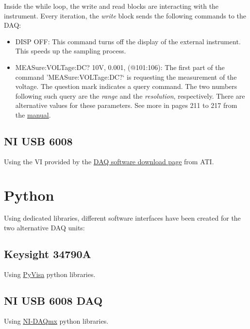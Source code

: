 \documentclass[a4paper]{article}
\begin{document}
Inside the while loop, the write and read blocks are interacting with the instrument. Every iteration, the \textit{write} block sends the following commands to the DAQ:

\begin{itemize}
	\item DISP OFF: This command turns off the display of the external instrument. This speeds up the sampling process.
	\item MEASure:VOLTage:DC? 10V, 0.001, (@101:106): The first part of the command 'MEASure:VOLTage:DC$?$` is requesting the measurement of the voltage. The question mark indicates a query command. The two numbers following such query are the \textit{range} and the \textit{resolution}, respectively. There are alternative values for these parameters. See more in pages 211 to 217 from the \hyperref{https://www.manualsbase.com/manual/439362/switch/hp_(hewlett-packard)/hp_34970a/}{category}{name}{manual}.
\end{itemize}

\subsection{NI USB 6008}

Using the VI provided by the \hyperref{https://www.ati-ia.com/products/ft/software/daq_software.aspx}{category}{name}{DAQ software download page} from ATI.


\section{Python}

Using dedicated libraries, different software interfaces have been created for the two alternative DAQ units:

\subsection{Keysight 34790A}

Using \hyperref{https://pyvisa.readthedocs.io/en/latest/index.html}{name}{category}{PyVisa} python libraries.

\subsection{NI USB 6008 DAQ}

Using \hyperref{https://nidaqmx-python.readthedocs.io/en/latest/}{name}{cat}{NI-DAQmx} python libraries.
\end{document}

